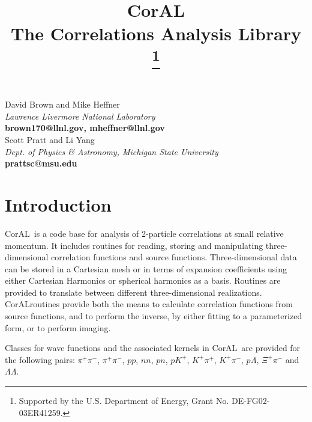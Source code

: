 \documentclass[10pt]{article}
\newcommand{\coral}{CorAL}
\begin{document}
\title{\coral\\
\Large \bf The Correlations Analysis Library
\thanks{Supported by the U.S. Department of Energy, Grant No.  DE-FG02-03ER41259.}
}

\maketitle

\begin{center}
David Brown and Mike Heffner\\
{\it Lawrence Livermore National Laboratory}\\
{\small \bf brown170@llnl.gov, mheffner@llnl.gov}\\
\vspace*{8pt}
Scott Pratt and Li Yang\\
{\it Dept. of Physics \& Astronomy, Michigan State University}\\
{\small\bf prattsc@msu.edu}

\end{center}

\vspace*{0.4in}

\tableofcontents

\newpage

\section{Introduction}

\coral\ is a code base for analysis of 2-particle correlations at small relative momentum. It includes routines for reading, storing and manipulating three-dimensional correlation functions and source functions. Three-dimensional data can be stored in a Cartesian mesh or in terms of expansion coefficients using either Cartesian Harmonics or spherical harmonics as a basis. Routines are provided to translate between different three-dimensional realizations. \coral routines provide both the means to calculate correlation functions from source functions, and to perform the inverse, by either fitting to a parameterized form, or to perform imaging.

Classes for wave functions and the associated kernels in \coral\ are provided for the following pairs: $\pi^+\pi^-$, $\pi^+\pi^-$, $pp$, $nn$, $pn$, $pK^+$, $K^+\pi^+$, $K^+\pi^-$, $p\Lambda$, $\Xi^+\pi^-$ and $\Lambda\Lambda$. 
\end{document}
